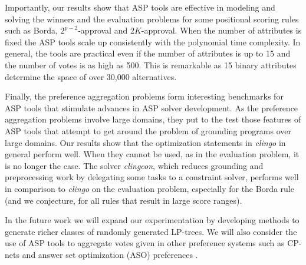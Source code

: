 Importantly, our results show that ASP tools are effective in modeling 
and solving the winners and the evaluation problems for some positional 
scoring rules such as Borda, $2^{p-2}$-approval and $2K$-approval. When 
the number of attributes is fixed the ASP tools scale up consistently with 
the polynomial time complexity. In general, the tools are practical even 
if the number of attributes is up to 15 and the number of votes is as high 
as 500. This is remarkable as 15 binary attributes determine the space of over 
30,000 alternatives. 

Finally, the preference aggregation problems form 
interesting benchmarks for ASP tools that stimulate advances in ASP
solver development. As the preference aggregation problems involve large 
domains, they put to the test those features of ASP tools that attempt 
to get around the problem of grounding programs over large domains. Our 
results show that the optimization statements in \emph{clingo} in 
general perform well. When they cannot be used, as in the evaluation 
problem, it is no longer the case. The solver \emph{clingcon}, which 
reduces grounding and preprocessing work by delegating some tasks to a constraint solver, 
performs well in comparison to \emph{clingo} on the evaluation problem,
especially for the Borda rule (and we conjecture, for all rules that
result in large score ranges).

In the future work we will expand our experimentation by developing
methods to generate richer classes of randomly generated LP-trees.
We will also consider the use of ASP tools to aggregate votes given in
other preference systems such as CP-nets \cite{bbdh03} and answer set 
optimization (ASO) preferences \cite{Brewka:ASO}.
